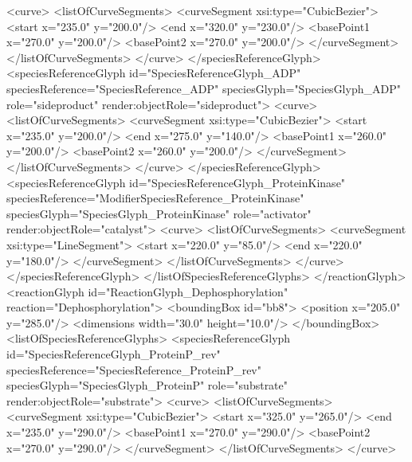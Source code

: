 {\begin{example}
         <curve>
          <listOfCurveSegments>
           <curveSegment xsi:type="CubicBezier">
            <start x="235.0" y="200.0"/>
            <end x="320.0" y="230.0"/>
            <basePoint1 x="270.0" y="200.0"/>
            <basePoint2 x="270.0" y="200.0"/>
           </curveSegment>
          </listOfCurveSegments>
         </curve>
        </speciesReferenceGlyph>
        <speciesReferenceGlyph id="SpeciesReferenceGlyph_ADP"
                        speciesReference="SpeciesReference_ADP" 
                        speciesGlyph="SpeciesGlyph_ADP" 
                        role="sideproduct" 
                        render:objectRole="sideproduct">
         <curve>
          <listOfCurveSegments>
           <curveSegment xsi:type="CubicBezier">
            <start x="235.0" y="200.0"/>
            <end x="275.0" y="140.0"/>
            <basePoint1 x="260.0" y="200.0"/>
            <basePoint2 x="260.0" y="200.0"/>
           </curveSegment>
          </listOfCurveSegments>
         </curve>
        </speciesReferenceGlyph>
        <speciesReferenceGlyph id="SpeciesReferenceGlyph_ProteinKinase" 
                        speciesReference="ModifierSpeciesReference_ProteinKinase" 
                        speciesGlyph="SpeciesGlyph_ProteinKinase" 
                        role="activator" render:objectRole="catalyst">
         <curve>
          <listOfCurveSegments>
           <curveSegment xsi:type="LineSegment">
            <start x="220.0" y="85.0"/>
            <end x="220.0" y="180.0"/>
           </curveSegment>
          </listOfCurveSegments>
         </curve>
        </speciesReferenceGlyph>
       </listOfSpeciesReferenceGlyphs>
      </reactionGlyph>
      <reactionGlyph id="ReactionGlyph_Dephosphorylation" 
                     reaction="Dephosphorylation">
       <boundingBox id="bb8">
        <position x="205.0" y="285.0"/>
        <dimensions width="30.0" height="10.0"/>
       </boundingBox>
       <listOfSpeciesReferenceGlyphs>
        <speciesReferenceGlyph id="SpeciesReferenceGlyph_ProteinP_rev"
                        speciesReference="SpeciesReference_ProteinP_rev"
                        speciesGlyph="SpeciesGlyph_ProteinP"
                        role="substrate" render:objectRole="substrate">
         <curve>
          <listOfCurveSegments>
           <curveSegment xsi:type="CubicBezier">
            <start x="325.0" y="265.0"/>
            <end x="235.0" y="290.0"/>
            <basePoint1 x="270.0" y="290.0"/>
            <basePoint2 x="270.0" y="290.0"/>
           </curveSegment>
          </listOfCurveSegments>
         </curve>

\end{example}}
